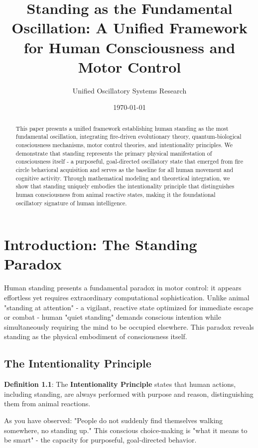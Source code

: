 \documentclass[12pt]{article}
\title{Standing as the Fundamental Oscillation: A Unified Framework for Human Consciousness and Motor Control}
\author{Unified Oscillatory Systems Research}
\date{\today}
\begin{document}
\maketitle

\begin{abstract}
This paper presents a unified framework establishing human standing as the most fundamental oscillation, integrating fire-driven evolutionary theory, quantum-biological consciousness mechanisms, motor control theories, and intentionality principles. We demonstrate that standing represents the primary physical manifestation of consciousness itself - a purposeful, goal-directed oscillatory state that emerged from fire circle behavioral acquisition and serves as the baseline for all human movement and cognitive activity. Through mathematical modeling and theoretical integration, we show that standing uniquely embodies the intentionality principle that distinguishes human consciousness from animal reactive states, making it the foundational oscillatory signature of human intelligence.
\end{abstract}

\section{Introduction: The Standing Paradox}

Human standing presents a fundamental paradox in motor control: it appears effortless yet requires extraordinary computational sophistication. Unlike animal "standing at attention" - a vigilant, reactive state optimized for immediate escape or combat - human "quiet standing" demands conscious intention while simultaneously requiring the mind to be occupied elsewhere. This paradox reveals standing as the physical embodiment of consciousness itself.

\subsection{The Intentionality Principle}

\textbf{Definition 1.1}: The \textbf{Intentionality Principle} states that human actions, including standing, are always performed with purpose and reason, distinguishing them from animal reactions.

As you have observed: "People do not suddenly find themselves walking somewhere, no standing up." This conscious choice-making is "what it means to be smart" - the capacity for purposeful, goal-directed behavior.
\end{document}
